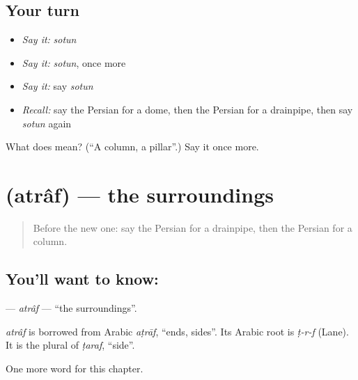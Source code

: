 \subsection*{Your turn}
\begin{itemize}
\raggedright
  \item \emph{Say it:} \emph{sotun}
  \item \emph{Say it:} \emph{sotun}, once more
  \item \emph{Say it:} say \emph{sotun}
  \item \emph{Recall:} say the Persian for a dome, then the Persian for a drainpipe, then say \emph{sotun} again
\end{itemize}

\begin{tcolorbox}[breakable,colback=teal!4,colframe=teal!35!black,title={Before you move on}]
What does  mean? (\textquotedblleft{}A column, a pillar\textquotedblright{}.) Say it once more.
\end{tcolorbox}
\section[\texorpdfstring{\fa{اطراف} (atrâf)}{اطراف (atrâf)}]{ (atrâf) — the surroundings}

\label{lesson:FA-C196-atraf}



\begin{quote}
Before the new one: say the Persian for a drainpipe, then the Persian for a column.
\end{quote}

\subsection*{You'll want to know: }
\textbf{} — \emph{atrâf} — \textquotedblleft{}the surroundings\textquotedblright{}.

\begin{cousinweb}
\emph{atrâf} is borrowed from Arabic \emph{aṭrāf}, \textquotedblleft{}ends, sides\textquotedblright{}. Its Arabic root is \emph{ṭ-r-f} (Lane). It is the plural of \emph{ṭaraf}, \textquotedblleft{}side\textquotedblright{}.
\end{cousinweb}

\begin{grammarlens}[title={What you've built}]
One more word for this chapter.
\end{grammarlens}

